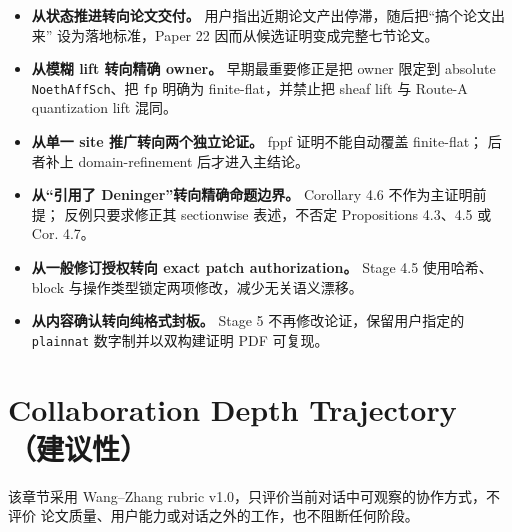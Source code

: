 \documentclass[12pt,a4paper]{article}
\providecommand{\tightlist}{\setlength{\itemsep}{0pt}\setlength{\parskip}{0pt}}
\begin{document}
\begin{itemize}
\tightlist
\item
  \textbf{从状态推进转向论文交付。}
  用户指出近期论文产出停滞，随后把``搞个论文出来'' 设为落地标准，Paper
  22 因而从候选证明变成完整七节论文。
\item
  \textbf{从模糊 lift 转向精确 owner。} 早期最重要修正是把 owner 限定到
  absolute \texttt{NoethAffSch}、把 \texttt{fp} 明确为
  finite-flat，并禁止把 sheaf lift 与 Route-A quantization lift 混同。
\item
  \textbf{从单一 site 推广转向两个独立论证。} fppf 证明不能自动覆盖
  finite-flat； 后者补上 domain-refinement 后才进入主结论。
\item
  \textbf{从``引用了 Deninger''转向精确命题边界。} Corollary 4.6
  不作为主证明前提； 反例只要求修正其 sectionwise 表述，不否定
  Propositions 4.3、4.5 或 Cor. 4.7。
\item
  \textbf{从一般修订授权转向 exact patch authorization。} Stage 4.5
  使用哈希、block 与操作类型锁定两项修改，减少无关语义漂移。
\item
  \textbf{从内容确认转向纯格式封板。} Stage 5
  不再修改论证，保留用户指定的 \texttt{plainnat} 数字制并以双构建证明
  PDF 可复现。
\end{itemize}

\hypertarget{collaboration-depth-trajectoryux5efaux8baeux6027}{%
\section{Collaboration Depth
Trajectory（建议性）}\label{collaboration-depth-trajectoryux5efaux8baeux6027}}

该章节采用 Wang--Zhang rubric
v1.0，只评价当前对话中可观察的协作方式，不评价
论文质量、用户能力或对话之外的工作，也不阻断任何阶段。
\end{document}

